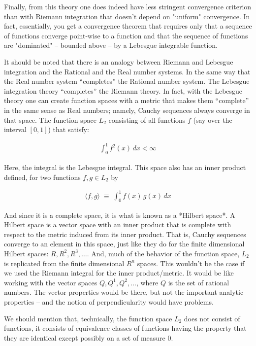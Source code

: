 \documentclass{article}
\begin{document}
Finally, from this theory one does indeed have less stringent convergence 
criterion than with Riemann integration that doesn't depend on "uniform" convergence.
In fact, essentially, you get a convergence theorem that requires only that a sequence
of functions converge point-wise to a function and that the sequence of functions 
are "dominated" -- bounded above -- by a Lebesgue integrable function.

It should be noted that there is an analogy between Riemann and Lebesgue integration 
and the Rational and the Real number systems. In the same way that the Real number 
system ``completes'' the Rational number system. The Lebesgue integration theory ``completes''
the Riemann theory. In fact, with the Lebesgue theory one can create function 
spaces with a metric that makes them ``complete'' in the same sense as Real 
numbers; namely, Cauchy sequences always converge in that space. 
The function space $L_2$ consisting of
all functions $f$ (say over the interval $[0,1]$) that satisfy:

\begin{eqnarray}
\int_0^1 f^2(x) \, dx < \infty
\end{eqnarray}

Here, the integral is the Lebesgue integral. This space also has an inner 
product defined, for two functions $f, g \in L_2$ by

\begin{eqnarray}
\langle f, g \rangle \; \equiv \; \int_0^1 f(x)\, g(x)\, dx
\end{eqnarray}

And since it is a complete space, it is what is known as a *Hilbert space*.
A Hilbert space is a vector space with an inner product that is complete with 
respect to the metric induced from its inner product. 
That is, Cauchy sequences converge to an element in this
space, just like they do for the finite dimensional Hilbert spaces: $R, R^2, R^3, \ldots$.
And, much of the behavior of the function space, $L_2$ is replicated from 
the finite dimensional $R^n$ spaces. This wouldn't be the case if we used
the Riemann integral for the inner product/metric. It would be like
working with the vector spaces $Q, Q^1, Q^2, \ldots$, where $Q$ is the set 
of rational numbers. The vector properties would be there, but not 
the important analytic properties -- and the notion of perpendicularity would
have problems.

We should mention that, technically, the function space $L_2$ does not 
consist of functions, it consists of 
equivalence classes of functions having the property
that they are identical except possibly on a set of measure $0$.
\end{document}
